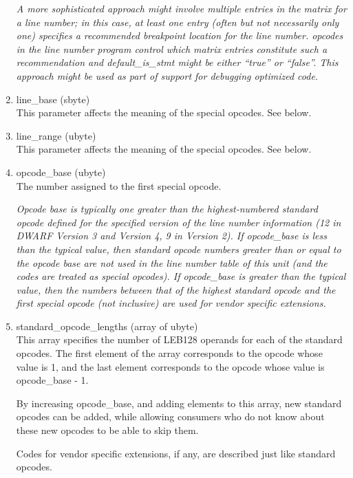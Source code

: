 \begin{enumerate}[1.]
\textit{A more sophisticated approach might involve multiple entries in
the matrix for a line number; in this case, at least one entry
(often but not necessarily only one) specifies a recommended
breakpoint location for the line number. 
opcodes in the line number program control which matrix entries
constitute such a recommendation and default\_is\_stmt might
be either ``true'' or ``false''. This approach might be
used as part of support for debugging optimized code.}

\item line\_base (sbyte) \\
This parameter affects the meaning of the special opcodes. See below.

\item line\_range (ubyte) \\
This parameter affects the meaning of the special opcodes. See below.

\item opcode\_base (ubyte) \\
The number assigned to the first special opcode.

\textit{Opcode base is typically one greater than the highest-numbered
standard opcode defined for the specified version of the line
number information (12 in DWARF Version 3 and Version 4, 9 in
Version 2).  If opcode\_base is less than the typical value,
then standard opcode numbers greater than or equal to the
opcode base are not used in the line number table of this unit
(and the codes are treated as special opcodes). If opcode\_base
is greater than the typical value, then the numbers between
that of the highest standard opcode and the first special
opcode (not inclusive) are used for vendor specific extensions.}

\item standard\_opcode\_lengths (array of ubyte) \\
This array specifies the number of LEB128 operands for each
of the standard opcodes. The first element of the array
corresponds to the opcode whose value is 1, and the last
element corresponds to the opcode whose value 
is opcode\_base - 1.

By increasing opcode\_base, and adding elements to this array,
new standard opcodes can be added, while allowing consumers who
do not know about these new opcodes to be able to skip them.

Codes for vendor specific extensions, if any, are described
just like standard opcodes.


\end{enumerate}
